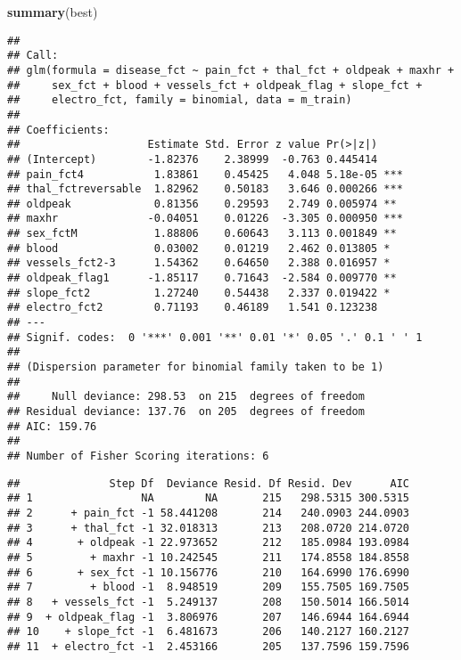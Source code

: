 \documentclass[
]{article}
\newenvironment{Shaded}{\begin{snugshade}}{\end{snugshade}}
\newcommand{\FunctionTok}[1]{\textcolor[rgb]{0.13,0.29,0.53}{\textbf{#1}}}
\newcommand{\NormalTok}[1]{#1}
\newcommand{\SpecialCharTok}[1]{\textcolor[rgb]{0.81,0.36,0.00}{\textbf{#1}}}
\begin{document}
\begin{Shaded}
\begin{Highlighting}[]
\FunctionTok{summary}\NormalTok{(best)}
\end{Highlighting}
\end{Shaded}

\begin{verbatim}
## 
## Call:
## glm(formula = disease_fct ~ pain_fct + thal_fct + oldpeak + maxhr + 
##     sex_fct + blood + vessels_fct + oldpeak_flag + slope_fct + 
##     electro_fct, family = binomial, data = m_train)
## 
## Coefficients:
##                    Estimate Std. Error z value Pr(>|z|)    
## (Intercept)        -1.82376    2.38999  -0.763 0.445414    
## pain_fct4           1.83861    0.45425   4.048 5.18e-05 ***
## thal_fctreversable  1.82962    0.50183   3.646 0.000266 ***
## oldpeak             0.81356    0.29593   2.749 0.005974 ** 
## maxhr              -0.04051    0.01226  -3.305 0.000950 ***
## sex_fctM            1.88806    0.60643   3.113 0.001849 ** 
## blood               0.03002    0.01219   2.462 0.013805 *  
## vessels_fct2-3      1.54362    0.64650   2.388 0.016957 *  
## oldpeak_flag1      -1.85117    0.71643  -2.584 0.009770 ** 
## slope_fct2          1.27240    0.54438   2.337 0.019422 *  
## electro_fct2        0.71193    0.46189   1.541 0.123238    
## ---
## Signif. codes:  0 '***' 0.001 '**' 0.01 '*' 0.05 '.' 0.1 ' ' 1
## 
## (Dispersion parameter for binomial family taken to be 1)
## 
##     Null deviance: 298.53  on 215  degrees of freedom
## Residual deviance: 137.76  on 205  degrees of freedom
## AIC: 159.76
## 
## Number of Fisher Scoring iterations: 6
\end{verbatim}

\begin{Shaded}
\end{Shaded}

\begin{verbatim}
##              Step Df  Deviance Resid. Df Resid. Dev      AIC
## 1                 NA        NA       215   298.5315 300.5315
## 2      + pain_fct -1 58.441208       214   240.0903 244.0903
## 3      + thal_fct -1 32.018313       213   208.0720 214.0720
## 4       + oldpeak -1 22.973652       212   185.0984 193.0984
## 5         + maxhr -1 10.242545       211   174.8558 184.8558
## 6       + sex_fct -1 10.156776       210   164.6990 176.6990
## 7         + blood -1  8.948519       209   155.7505 169.7505
## 8   + vessels_fct -1  5.249137       208   150.5014 166.5014
## 9  + oldpeak_flag -1  3.806976       207   146.6944 164.6944
## 10    + slope_fct -1  6.481673       206   140.2127 160.2127
## 11  + electro_fct -1  2.453166       205   137.7596 159.7596
\end{verbatim}
\end{document}
